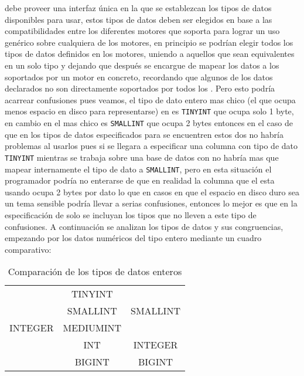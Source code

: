 \cc debe proveer una interfaz única en la que se establezcan los tipos de datos disponibles para usar, estos tipos de datos deben ser elegidos en base a las compatibilidades entre los diferentes motores que soporta para lograr un uso genérico sobre cualquiera de los motores, en principio se podrían elegir todos los tipos de datos definidos en los motores, uniendo a aquellos que sean equivalentes en un solo tipo y dejando que después \cc se encargue de mapear los datos a los soportados por un motor en concreto, recordando que algunos de los datos declarados no son directamente soportados por todos los \dd. Pero esto podría acarrear confusiones pues veamos, el tipo de dato entero mas chico (el que ocupa menos espacio en disco para representarse) en \m\cite{mysql:datatypes} es \verb=TINYINT= que ocupa solo 1 byte, en cambio en \p\cite{postgre:datatypes} el mas chico es \verb=SMALLINT= que ocupa 2 bytes entonces en el caso de que en los tipos de datos especificados para \cc se encuentren estos dos no habría problemas al usarlos pues si se llegara a especificar una columna con tipo de dato \verb=TINYINT= mientras se trabaja sobre una base de datos con \p no habría mas que mapear internamente el tipo de dato a \verb=SMALLINT=, pero en esta situación el programador podría no enterarse de que en realidad la columna que el esta usando ocupa 2 bytes por dato lo que en casos en que el espacio en disco duro sea un tema sensible podría llevar a serias confusiones, entonces lo mejor es que en la especificación de \cc solo se incluyan los tipos que no lleven a este tipo de confusiones. A continuación se analizan los tipos de datos y sus congruencias, empezando por los datos numéricos del tipo entero mediante un cuadro comparativo:
        
\begin{table}[h]
\begin{center}
\begin{tabular}{|c|c|c|}
\hline \s      & \m        & \p \\ 
\hline         & TINYINT   &  \\ 
               & SMALLINT  & SMALLINT \\ 
       INTEGER & MEDIUMINT &  \\
               & INT       & INTEGER \\
               & BIGINT    & BIGINT \\  
\hline 
\end{tabular} 
\end{center}
\caption{Comparación de los tipos de datos enteros}
\end{table}

